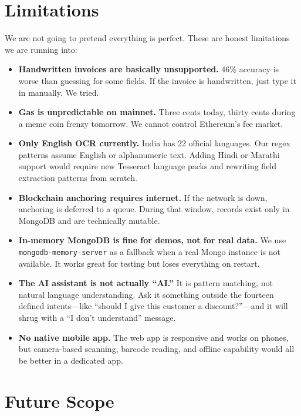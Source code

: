\documentclass[conference]{IEEEtran}
\begin{document}
\section{Limitations}

We are not going to pretend everything is perfect. These are honest limitations we are running into:
\begin{itemize}
    \item \textbf{Handwritten invoices are basically unsupported.} 46\% accuracy is worse than guessing for some fields. If the invoice is handwritten, just type it in manually. We tried.
    \item \textbf{Gas is unpredictable on mainnet.} Three cents today, thirty cents during a meme coin frenzy tomorrow. We cannot control Ethereum's fee market.
    \item \textbf{Only English OCR currently.} India has 22 official languages. Our regex patterns assume English or alphanumeric text. Adding Hindi or Marathi support would require new Tesseract language packs and rewriting field extraction patterns from scratch.
    \item \textbf{Blockchain anchoring requires internet.} If the network is down, anchoring is deferred to a queue. During that window, records exist only in MongoDB and are technically mutable.
    \item \textbf{In-memory MongoDB is fine for demos, not for real data.} We use \texttt{mongodb-memory-server} as a fallback when a real Mongo instance is not available. It works great for testing but loses everything on restart.
    \item \textbf{The AI assistant is not actually ``AI.''} It is pattern matching, not natural language understanding. Ask it something outside the fourteen defined intents---like ``should I give this customer a discount?''---and it will shrug with a ``I don't understand'' message.
    \item \textbf{No native mobile app.} The web app is responsive and works on phones, but camera-based scanning, barcode reading, and offline capability would all be better in a dedicated app.
\end{itemize}

\section{Future Scope}
\end{document}
